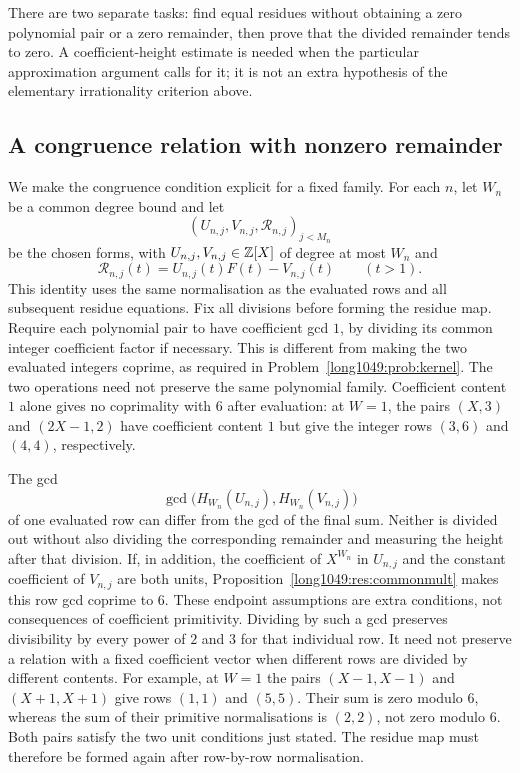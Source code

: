 \documentclass[11pt]{article}
\begin{document}
There are two separate tasks: find equal residues without obtaining a
zero polynomial pair or a zero remainder, then prove that the divided
remainder tends to zero. A coefficient-height estimate is needed when
the particular approximation argument calls for it; it is not an extra
hypothesis of the elementary irrationality criterion above.

\subsection{A congruence relation with nonzero remainder}

We make the congruence condition explicit for a fixed family. For each
$n$, let $W_n$ be a common degree bound and let
\[
 (U_{n,j},V_{n,j},\mathcal R_{n,j})_{j<M_n}
\]
be the chosen forms, with $U_{n,j},V_{n,j}\in\mathbb{Z}[X]$ of degree at most
$W_n$ and
\[
 \mathcal R_{n,j}(t)=U_{n,j}(t)F(t)-V_{n,j}(t)\qquad(t>1).
\]
This identity uses the same normalisation as the evaluated rows and
all subsequent residue equations. Fix all divisions before forming the
residue map. Require each
polynomial pair to have coefficient gcd $1$, by dividing its common
integer coefficient factor if necessary. This is different from making
the two evaluated integers coprime, as required in
Problem~\ref{long1049:prob:kernel}. The two operations need not preserve
the same polynomial family. Coefficient content $1$ alone gives no
coprimality with $6$ after evaluation: at $W=1$, the pairs $(X,3)$
and $(2X-1,2)$ have coefficient content $1$ but give the integer rows
$(3,6)$ and $(4,4)$, respectively.

The gcd
\[
 \gcd\!\bigl(H_{W_n}(U_{n,j}),H_{W_n}(V_{n,j})\bigr)
\]
of one evaluated row can differ from the gcd of the final sum. Neither
is divided out without also dividing the corresponding remainder and
measuring the height after that division. If, in addition, the
coefficient of $X^{W_n}$ in $U_{n,j}$ and the constant coefficient of
$V_{n,j}$ are both units, Proposition~\ref{long1049:res:commonmult}
makes this row gcd coprime to $6$. These endpoint assumptions are
extra conditions, not consequences of coefficient primitivity.
Dividing by such a gcd preserves divisibility by every power of $2$
and $3$ for that individual row. It need not preserve a relation
with a fixed coefficient vector when different rows are divided by different
contents. For example, at $W=1$ the pairs $(X-1,X-1)$ and $(X+1,X+1)$
give rows $(1,1)$ and $(5,5)$. Their sum is zero modulo $6$, whereas
the sum of their primitive normalisations is $(2,2)$, not zero modulo
$6$. Both pairs satisfy the two unit conditions just stated. The
residue map must therefore be formed again after row-by-row normalisation.
\end{document}
